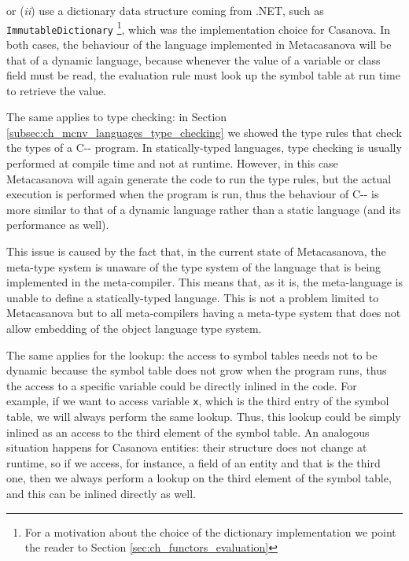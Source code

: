 \noindent
or (\textit{ii}) use a dictionary data structure coming from .NET, such as\\ \texttt{ImmutableDictionary} \footnote{For a motivation about the choice of the dictionary implementation we point the reader to Section \ref{sec:ch_functors_evaluation}}, which was the implementation choice for Casanova. In both cases, the behaviour of the language implemented in Metacasanova will be that of a dynamic language, because whenever the value of a variable or class field must be read, the evaluation rule must look up the symbol table at run time to retrieve the value.

The same applies to type checking: in Section \ref{subsec:ch_mcnv_languages_type_checking} we showed the type rules that check the types of a C-{}- program. In statically-typed languages, type checking is usually performed at compile time and not at runtime. However, in this case Metacasanova will again generate the code to run the type rules, but the actual execution is performed when the program is run, thus the behaviour of C-{}- is more similar to that of a dynamic language rather than a static language (and its performance as well).

This issue is caused by the fact that, in the current state of Metacasanova, the meta-type system is unaware of the type system of the language that is being implemented in the meta-compiler. This means that, as it is, the meta-language is unable to define a statically-typed language. This is not a problem limited to Metacasanova but to all meta-compilers having a meta-type system that does not allow embedding of the object language type system. 

The same applies for the lookup: the access to symbol tables needs not to be dynamic because the symbol table does not grow when the program runs, thus the access to a specific variable could be directly inlined in the code. For example, if we want to access variable \texttt{x}, which is the third entry of the symbol table, we will always perform the same lookup. Thus, this lookup could be simply inlined as an access to the third element of the symbol table. An analogous situation happens for Casanova entities: their structure does not change at runtime, so if we access, for instance, a field of an entity and that is the third one, then we always perform a lookup on the third element of the symbol table, and this can be inlined directly as well.

